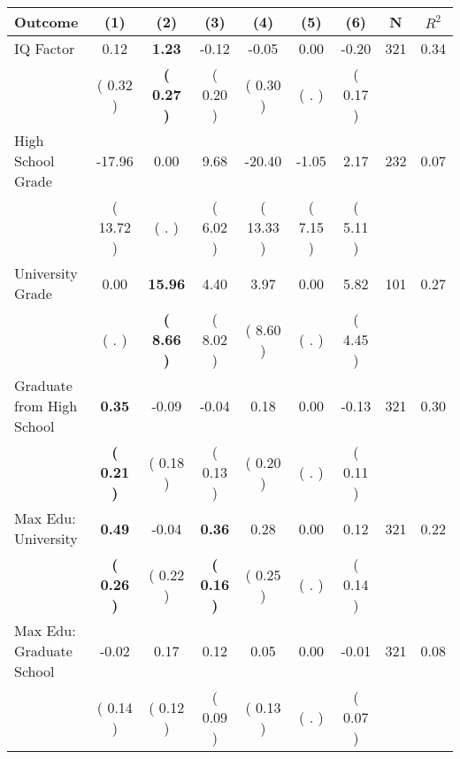 \begin{tabular}{lcccccccc}
\toprule
 \textbf{Outcome} & \textbf{(1)} & \textbf{(2)} & \textbf{(3)} & \textbf{(4)} & \textbf{(5)} & \textbf{(6)} & \textbf{N} & \textbf{$ R^2$} \\
\midrule
IQ Factor &      0.12 & \textbf{     1.23} &     -0.12 &     -0.05 &      0.00 &     -0.20 & 321 &       0.34 \\ 
 & (     0.32 ) & \textbf{(     0.27 )} & (     0.20 ) & (     0.30 ) & (        . ) & (     0.17 ) & \\
High School Grade &    -17.96 &      0.00 &      9.68 &    -20.40 &     -1.05 &      2.17 & 232 &       0.07 \\ 
 & (    13.72 ) & (        . ) & (     6.02 ) & (    13.33 ) & (     7.15 ) & (     5.11 ) & \\
University Grade &      0.00 & \textbf{    15.96} &      4.40 &      3.97 &      0.00 &      5.82 & 101 &       0.27 \\ 
 & (        . ) & \textbf{(     8.66 )} & (     8.02 ) & (     8.60 ) & (        . ) & (     4.45 ) & \\
Graduate from High School & \textbf{     0.35} &     -0.09 &     -0.04 &      0.18 &      0.00 &     -0.13 & 321 &       0.30 \\ 
 & \textbf{(     0.21 )} & (     0.18 ) & (     0.13 ) & (     0.20 ) & (        . ) & (     0.11 ) & \\
Max Edu: University & \textbf{     0.49} &     -0.04 & \textbf{     0.36} &      0.28 &      0.00 &      0.12 & 321 &       0.22 \\ 
 & \textbf{(     0.26 )} & (     0.22 ) & \textbf{(     0.16 )} & (     0.25 ) & (        . ) & (     0.14 ) & \\
Max Edu: Graduate School &     -0.02 &      0.17 &      0.12 &      0.05 &      0.00 &     -0.01 & 321 &       0.08 \\ 
 & (     0.14 ) & (     0.12 ) & (     0.09 ) & (     0.13 ) & (        . ) & (     0.07 ) & \\
\bottomrule
\end{tabular}
